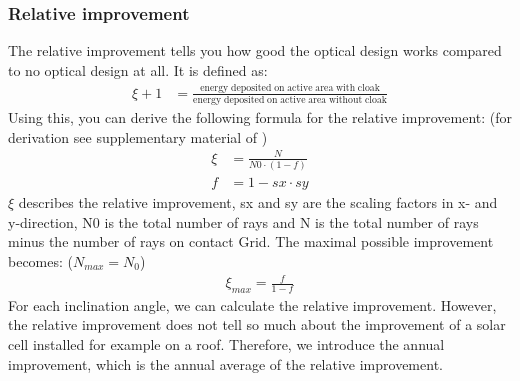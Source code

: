 \subsubsection{Relative improvement}
The relative improvement tells you how good the optical design works compared to no optical design at all. 
It is defined as:
\begin{align*}
\xi +1 &= \frac{\mathrm{energy \;deposited \;on \;active \;area \;with \;cloak }}{\mathrm{energy \;deposited \;on \;active \;area \;without \;cloak}}
\end{align*}
Using this, you can derive the following formula for the relative improvement: (for derivation see supplementary material of \cite{schumann2015cloaked} )
\begin{align*}
\xi &=\frac{N}{N0 \cdot (1-f) } \\
f&= 1-sx \cdot sy
\end{align*}
$\xi$ describes the relative improvement, sx and sy are the scaling factors in x- and y-direction, N0 is the total number of rays and N is the total number of rays minus the number of rays on contact Grid.
The maximal possible improvement becomes: ($N_{max}=N_0$)
\begin{align*}
\xi_{max}= \frac{f}{1-f}
\end{align*}
For each inclination angle, we can calculate the relative improvement. However, the relative improvement does not tell so much about the improvement of a solar cell installed for example on a roof. Therefore, we introduce the annual improvement, which is the annual average of the relative improvement. 


